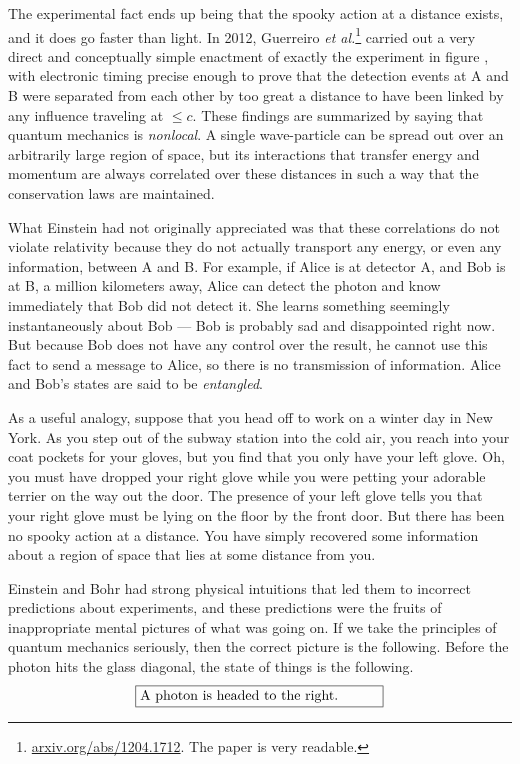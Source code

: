 The experimental fact ends up being that the spooky action at a
distance exists, and it does go faster than light. In 2012, Guerreiro
\emph{et al.}\footnote{\url{arxiv.org/abs/1204.1712}. The paper is
very readable.} carried out a very direct and conceptually simple
enactment of exactly the experiment in figure ,
with electronic timing precise enough to prove that the detection
events at A and B were separated from each other by too great a
distance to have been linked by any influence traveling at $\le c$.
These findings are summarized by saying that quantum mechanics is
\emph{nonlocal}.  A single wave-particle can be spread out over
an arbitrarily large region of space, but its interactions that
transfer energy and momentum are always correlated over these
distances in such a way that the conservation laws are maintained. 

What Einstein had not originally appreciated was that these
correlations do not violate relativity because they do not actually
transport any energy, or even any information, between A and B. For
example, if Alice is at detector A, and Bob is at B, a million
kilometers away, Alice can detect the photon and know immediately that
Bob did not detect it. She learns something seemingly instantaneously
about Bob --- Bob is probably sad and disappointed right now. But
because Bob does not have any control over the result, he cannot use
this fact to send a message to Alice, so there is no transmission of
information. Alice and Bob's states are said to be \emph{entangled}.\label{bob-alice-entangled}

As a useful analogy, suppose that you head off to work on a winter day
in New York. As you step out of the subway station into the cold air,
you reach into your coat pockets for your gloves, but you find that
you only have your left glove. Oh, you must have dropped your right
glove while you were petting your adorable terrier on the way out the
door. The presence of your left glove tells you that your right glove
must be lying on the floor by the front door. But there has been no
spooky action at a distance. You have simply recovered some
information about a region of space that lies at some distance from
you.

Einstein and Bohr had strong physical intuitions that led them to
incorrect predictions about experiments, and these predictions were
the fruits of inappropriate mental pictures of what was going on. If we take
the principles of quantum mechanics seriously, then the correct picture
is the following. Before the photon hits the glass
diagonal, the state of things is the following.
\begin{equation*}
\fbox{\parbox{60mm}{A photon is headed to the right.}}
\end{equation*}

